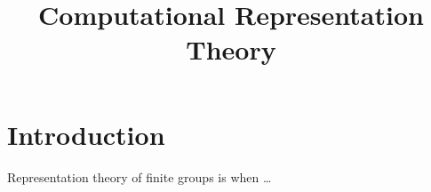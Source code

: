 \documentclass[12pt]{amsart}
\title{Computational Representation Theory}
\begin{document}
\maketitle

\tableofcontents 

\section{Introduction}
\label{sec:intro}

Representation theory of finite groups is when \ldots

\nocite{*}




\end{document}
